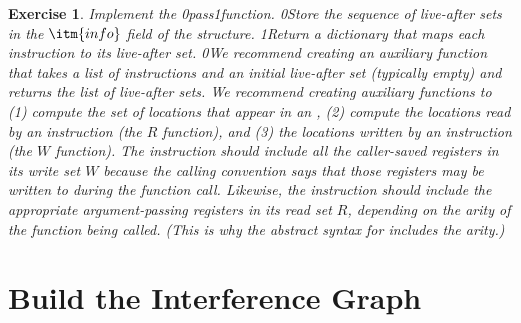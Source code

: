 \documentclass[7x10]{TimesAPriori_MIT}%
\def\racketEd{0}
\def\pythonEd{1}
\def\edition{0}
\newcommand{\racket}[1]{{\if\edition\racketEd{#1}\fi}}
\newcommand{\python}[1]{{\if\edition\pythonEd #1\fi}}
\newtheorem{exercise}[theorem]{Exercise}
\numberwithin{theorem}{chapter}
\numberwithin{definition}{chapter}
\numberwithin{equation}{chapter}
\begin{document}
\begin{exercise}\normalfont\normalsize
  Implement the  \racket{pass}\python{function}.
\racket{Store the sequence of live-after sets in the $\itm{info}$
  field of the \code{Block} structure.}
%
\python{Return a dictionary that maps each instruction to its
  live-after set.}
%
\racket{We recommend creating an auxiliary function that takes a list
  of instructions and an initial live-after set (typically empty) and
  returns the list of live-after sets.}
%
We recommend creating auxiliary functions to (1) compute the set
of locations that appear in an \Arg{}, (2) compute the locations read
by an instruction (the $R$ function), and (3) the locations written by
an instruction (the $W$ function). The  instruction should
include all the caller-saved registers in its write set $W$ because
the calling convention says that those registers may be written to
during the function call. Likewise, the  instruction
should include the appropriate argument-passing registers in its
read set $R$, depending on the arity of the function being
called. (This is why the abstract syntax for  includes the
arity.)
\end{exercise}


\section{Build the Interference Graph}
\label{sec:build-interference}
\end{document}
